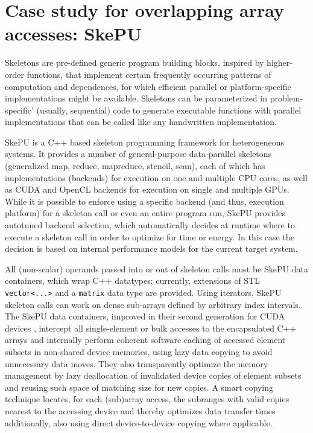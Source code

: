 \section{Case study for overlapping array accesses: SkePU}

Skeletons are pre-defined generic program building blocks,
inspired by higher-order functions,
that implement certain frequently occurring patterns of
computation and dependences, for which efficient parallel
or platform-specific implementations might be available.
Skeletons can be parameterized in problem-specific'
(usually, sequential) code to generate executable functions
with parallel implementations that can be called like
any handwritten implementation.

SkePU \cite{Enmyren10,Ernstsson18} 
is a C++ based skeleton programming framework for heterogeneous systems.
It provides a number of general-purpose data-parallel skeletons
(generalized map, reduce, mapreduce, stencil, scan), each of
which has implementations (backends) for execution on one and multiple CPU cores, as
well as CUDA and OpenCL backends for execution on single and multiple GPUs.
While it is possible to enforce using a specific backend (and thus,
execution platform) for a skeleton call or even an entire program
run, SkePU provides autotuned backend selection, which automatically 
decides at runtime where to execute a 
skeleton call in order to optimize for time or energy.
In this case the decision is based on internal performance models for the current target system. 

All (non-scalar) operands passed into or out of skeleton calls must be
SkePU data containers, which wrap C++ datatypes;
currently, extensions of STL \texttt{vector<...>}
and a \texttt{matrix} data type are provided.
Using iterators, SkePU skeleton calls can work on dense sub-arrays
defined by arbitrary index intervals.
The SkePU data containers, improved in their second generation for
CUDA devices \cite{Dastgeer-IJPP15}, intercept all single-element
or bulk accesses to the encapsulated C++ arrays and
internally perform coherent software caching of
accessed element subsets in non-shared device memories, 
using lazy data copying to avoid unnecessary data moves.
They also transparently optimize the memory management
by lazy deallocation of invalidated device copies of element
subsets and reusing such space of matching size for new copies.
A smart copying technique locates, for each (sub)array access, the 
subranges with valid copies nearest to the accessing device
and thereby optimizes data transfer times additionally,
also using direct device-to-device copying where applicable.


